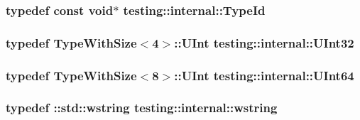 \hypertarget{namespacetesting_1_1internal_ab1114197d3c657d8b7f8e0c5caa12d00}{
\subsubsection[{Type\-Id}]{\setlength{\rightskip}{0pt plus 5cm}typedef const {\bf void}$\ast$ {\bf testing\-::internal\-::\-Type\-Id}}}\label{namespacetesting_1_1internal_ab1114197d3c657d8b7f8e0c5caa12d00}
\hypertarget{namespacetesting_1_1internal_a40d4fffcd2bf56f18b1c380615aa85e3}{
\subsubsection[{U\-Int32}]{\setlength{\rightskip}{0pt plus 5cm}typedef {\bf Type\-With\-Size}$<$4$>$\-::U\-Int {\bf testing\-::internal\-::\-U\-Int32}}}\label{namespacetesting_1_1internal_a40d4fffcd2bf56f18b1c380615aa85e3}
\hypertarget{namespacetesting_1_1internal_aa6a1ac454e6d7e550fa4925c62c35caa}{
\subsubsection[{U\-Int64}]{\setlength{\rightskip}{0pt plus 5cm}typedef {\bf Type\-With\-Size}$<$8$>$\-::U\-Int {\bf testing\-::internal\-::\-U\-Int64}}}\label{namespacetesting_1_1internal_aa6a1ac454e6d7e550fa4925c62c35caa}
\hypertarget{namespacetesting_1_1internal_a3f543179329c353aee1d7b54a9a8e335}{
\subsubsection[{wstring}]{\setlength{\rightskip}{0pt plus 5cm}typedef \-::std\-::wstring {\bf testing\-::internal\-::wstring}}}\label{namespacetesting_1_1internal_a3f543179329c353aee1d7b54a9a8e335}


